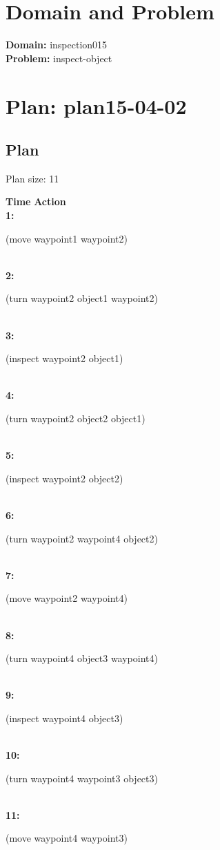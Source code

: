 \documentclass[a4paper,12pt]{article}
\author{\mbox{\sc {\sc Val}}}
\newcommand{\headingtimeaction}{{\bf Time} \qquad \= {\bf Action}\\[0.8ex]}
\newcommand{\atime}[1]{{\bf #1:}}
\newcommand{\action}[1]{{\sf #1}}
\newcommand{\listrow}[1]{\begin{minipage}[t]{11.5cm} #1 \end{minipage}}
\begin{document}
 \maketitle 
\section{Domain and Problem}
{\bf Domain:} inspection015\\
{\bf Problem:} inspect-object
\section{\sloppy Plan: plan15-04-02}
\subsection{Plan}
Plan size: 11
\begin{tabbing}
\headingtimeaction 
\atime{1} \> \listrow{\action{(move waypoint1 waypoint2)}}\\
\atime{2} \> \listrow{\action{(turn waypoint2 object1 waypoint2)}}\\
\atime{3} \> \listrow{\action{(inspect waypoint2 object1)}}\\
\atime{4} \> \listrow{\action{(turn waypoint2 object2 object1)}}\\
\atime{5} \> \listrow{\action{(inspect waypoint2 object2)}}\\
\atime{6} \> \listrow{\action{(turn waypoint2 waypoint4 object2)}}\\
\atime{7} \> \listrow{\action{(move waypoint2 waypoint4)}}\\
\atime{8} \> \listrow{\action{(turn waypoint4 object3 waypoint4)}}\\
\atime{9} \> \listrow{\action{(inspect waypoint4 object3)}}\\
\atime{10} \> \listrow{\action{(turn waypoint4 waypoint3 object3)}}\\
\atime{11} \> \listrow{\action{(move waypoint4 waypoint3)}}\\
\end{tabbing}
\end{document}
